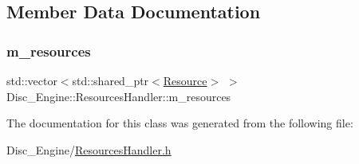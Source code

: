 \subsection{Member Data Documentation}
\mbox{\label{class_disc___engine_1_1_resources_handler_a097a16434ff1b7ef490f08e18ef10c84}} 
\subsubsection{\texorpdfstring{m\+\_\+resources}{m\_resources}}
{\footnotesize\ttfamily std\+::vector$<$std\+::shared\+\_\+ptr$<$\mbox{\hyperlink{class_disc___engine_1_1_resource}{Resource}}$>$ $>$ Disc\+\_\+\+Engine\+::\+Resources\+Handler\+::m\+\_\+resources\hspace{0.3cm}{\ttfamily [private]}}



The documentation for this class was generated from the following file\+:\begin{DoxyCompactItemize}
\item 
Disc\+\_\+\+Engine/\mbox{\hyperlink{_resources_handler_8h}{Resources\+Handler.\+h}}\end{DoxyCompactItemize}
